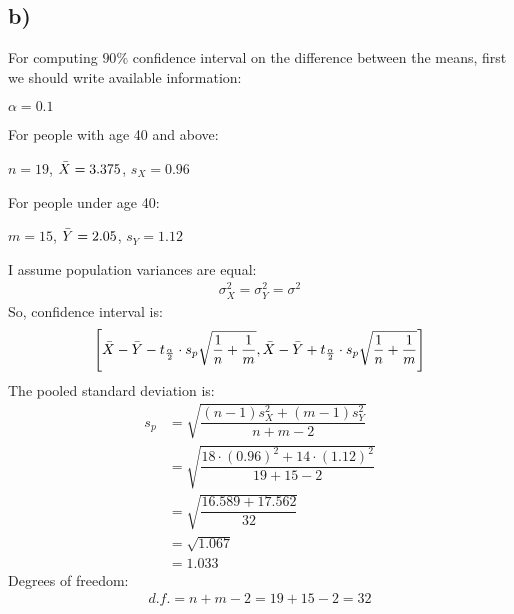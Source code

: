 \documentclass[12pt]{article}
\begin{document}
\subsection*{b)}
For computing $90\%$  confidence interval on the difference between the means, first we should write available information: \\
\begin{center}
    $\alpha = 0.1$
\end{center}
For people with age 40 and above:
\begin{center}
    $n = 19$, $\Bar{X} = 3.375$, $s_{X} = 0.96$\\
\end{center}
For people under age 40: 
\begin{center}
    $m = 15$, $\Bar{Y} = 2.05$, $s_{Y} = 1.12$\\
\end{center}
I assume population variances are equal: 
\begin{equation}
    \begin{split}
        \sigma^{2}_{X} = \sigma^{2}_Y = \sigma^2
    \end{split}
\end{equation}
So, confidence interval is:
\begin{equation}
    \begin{split}
        \left[ \Bar{X} - \Bar{Y} - t_{\frac{\alpha}{2}} \cdot s_p \sqrt{\dfrac{1}{n}+\dfrac{1}{m}}, \Bar{X} - \Bar{Y} + t_{\frac{\alpha}{2}} \cdot s_p \sqrt{\dfrac{1}{n}+\dfrac{1}{m}} \right]
    \end{split}
\end{equation}
The pooled standard deviation is:
\begin{equation}
    \begin{split}
        s_p &= \sqrt{\dfrac{(n-1)s^{2}_X+(m-1)s^{2}_Y}{n+m-2}} \\
            &= \sqrt{\dfrac{18 \cdot (0.96)^2 + 14 \cdot (1.12)^2}{19+15-2}}\\
            &= \sqrt{\dfrac{16.589 + 17.562}{32}} \\
            &= \sqrt{1.067}\\
            &= 1.033
    \end{split}
\end{equation}
Degrees of freedom:
\begin{equation}
    \begin{split}
        d.f. = n+m-2 = 19+15-2=32        
    \end{split}
\end{equation}
\end{document}
